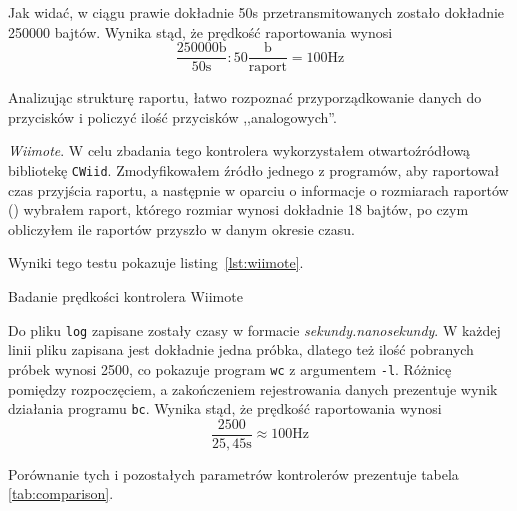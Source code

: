 Jak widać, w ciągu prawie dokładnie 50s przetransmitowanych zostało dokładnie 250000 bajtów. Wynika stąd, że prędkość raportowania wynosi
\begin{equation}
 \frac{250000\textrm{b}}{50\textrm{s}} : 50\frac{\textrm{b}}{\textrm{raport}} = 100\textrm{Hz}
\end{equation}

Analizując strukturę raportu, łatwo rozpoznać przyporządkowanie danych do przycisków i policzyć ilość przycisków ,,analogowych''.
\newline

\textsl{Wiimote}. W celu zbadania tego kontrolera wykorzystałem otwartoźródłową bibliotekę \texttt{CWiid}\citep{CWiid}. Zmodyfikowałem źródło jednego z programów, aby raportował czas przyjścia raportu, a następnie w oparciu o informacje o rozmiarach raportów (\citep{Wiibrew}) wybrałem raport, którego rozmiar wynosi dokładnie 18 bajtów, po czym obliczyłem ile raportów przyszło w danym okresie czasu.

Wyniki tego testu pokazuje listing~\ref{lst:wiimote}.

\begin{listing}
  
  \caption{Badanie prędkości kontrolera Wiimote}
  \label{lst:wiimote}
\end{listing}

Do pliku \texttt{log} zapisane zostały czasy w formacie \textit{sekundy.nanosekundy}. W każdej linii pliku zapisana jest dokładnie jedna próbka, dlatego też ilość pobranych próbek wynosi 2500, co pokazuje program \texttt{wc} z argumentem \texttt{-l}. Różnicę pomiędzy rozpoczęciem, a zakończeniem rejestrowania danych prezentuje wynik działania programu \texttt{bc}. Wynika stąd, że prędkość raportowania wynosi
\begin{equation}
 \frac{2500}{25,45\textrm{s}} \approx 100\textrm{Hz}
\end{equation}

Porównanie tych i pozostałych parametrów kontrolerów prezentuje tabela \ref{tab:comparison}.


